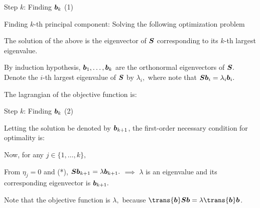 \documentclass[handout,fleqn,aspectratio=169]{beamer}
\begin{document}
\begin{frame}{Step $k$: Finding $\bm{b}_k$ (1)}

\plitemsep 0.1in

\bci 
\item Finding $k$-th principal component: Solving the following optimization problem
\item {} The solution of the above is the eigenvector of $\bm{S}$ corresponding to its $k$-th largest eigenvalue. 

\item {} 
\small
By induction hypothesis, $\bm{b}_1, \ldots, \bm{b}_k$ are the orthonormal eigenvectors of $\bm{S}.$ Denote the $i$-th largest eigenvalue of $\bm{S}$ by $\lambda_i,$ where note that $\bm{S} \bm{b}_i = \lambda_i \bm{b}_i.$

The lagrangian of the objective function is:

\eci
\end{frame}

\begin{frame}{Step $k$: Finding $\bm{b}_k$ (2)}

\small
\plitemsep 0.07in
\bci 
\item Letting the solution be denoted by $\bm{b}_{k+1}$, the first-order necessary condition for optimality is: 
\vspace{-0.3cm}
\item Now, for any $j \in \{1, \ldots, k \},$
\vspace{-0.3cm}
\item From $\eta_j =0$ and (*), $\bm{S} \bm{b}_{k+1} = \lambda \bm{b}_{k+1}.$ $\implies$ $\lambda$ is an eigenvalue and its corresponding eigenvector is $\bm{b}_{k+1}.$ 

\item Note that the objective function is $\lambda,$ because $\trans{\vb}\mS \vb = \lambda \trans{\vb} \vb$. 
\eci
\end{frame}
\end{document}
